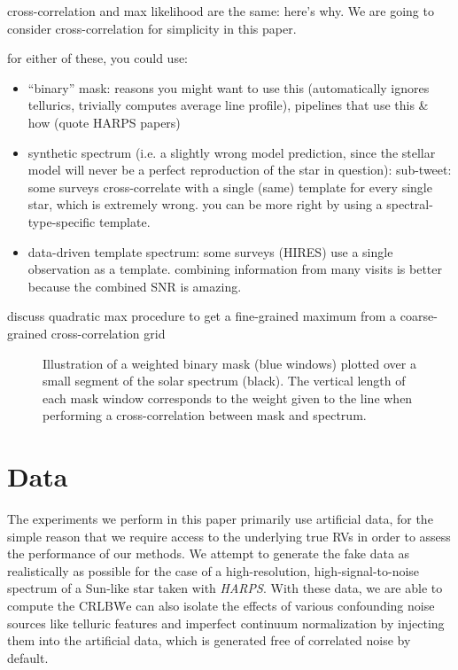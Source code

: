 \documentclass[modern]{aastex61}
\newcommand{\acronym}[1]{{\small{#1}}}
\newcommand{\project}[1]{\textsl{#1}}
\newcommand{\HARPS}{\project{\acronym{HARPS}}}
\newcommand{\CRLB}{\acronym{CRLB}}
\begin{document}
cross-correlation and max likelihood are the same: here's why. We are going to consider cross-correlation for simplicity in this paper.

for either of these, you could use:
\begin{itemize}
\item ``binary'' mask: reasons you might want to use this (automatically ignores tellurics, trivially computes average line profile), pipelines that use this \& how (quote HARPS papers)
\item synthetic spectrum (i.e. a slightly wrong model prediction, since the stellar model will never be a perfect reproduction of the star in question): sub-tweet: some surveys cross-correlate with a single (same) template for every single star, which is extremely wrong. you can be more right by using a spectral-type-specific template.
\item data-driven template spectrum: some surveys (HIRES) use a single observation as a template. combining information from many visits is better because the combined SNR is amazing.
\end{itemize}


discuss quadratic max procedure to get a fine-grained maximum from a coarse-grained cross-correlation grid


\begin{figure}
\centering
\caption{Illustration of a weighted binary mask (blue windows) plotted over a small segment of the solar spectrum (black). The vertical length of each mask window corresponds to the weight given to the line when performing a cross-correlation between mask and spectrum.}
\label{fig:binarymask}
\end{figure}

\section{Data}
\label{s:data}

The experiments we perform in this paper primarily use artificial data, for the simple reason that we require access to the underlying true RVs in order to assess the performance of our methods. 
We attempt to generate the fake data as realistically as possible for the case of a high-resolution, high-signal-to-noise spectrum of a Sun-like star taken with \HARPS. 
With these data, we are able to compute the \CRLB\. 
We can also isolate the effects of various confounding noise sources like telluric features and imperfect continuum normalization by injecting them into the artificial data, which is generated free of correlated noise by default.
\end{document}
